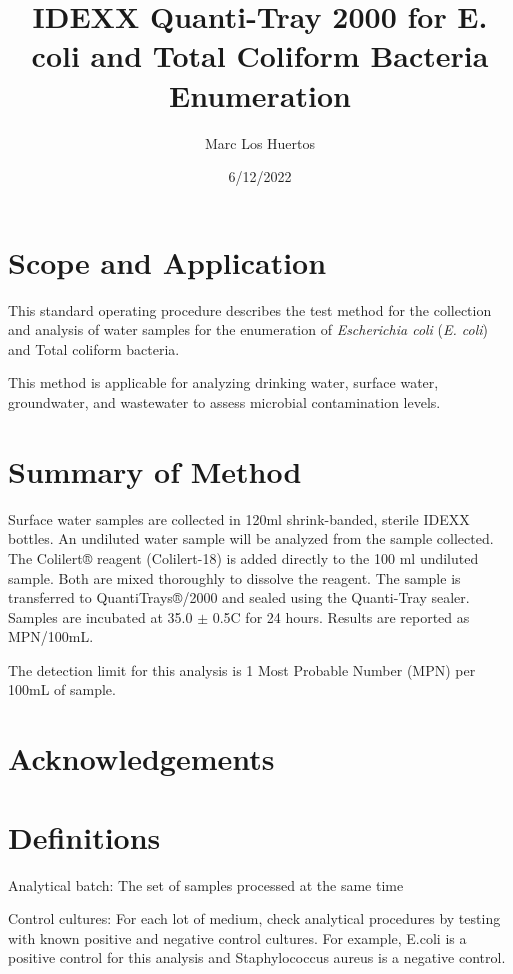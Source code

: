 \documentclass[12pt]{../SOP4_alpha}\usepackage[]{graphicx}\usepackage[]{xcolor}
\title{IDEXX Quanti-Tray 2000 for E. coli and Total Coliform Bacteria Enumeration}
\date{6/12/2022}
\author{Marc Los Huertos}
\begin{document}
\maketitle

\section{Scope and Application}

\NP This standard operating procedure describes the test method for the collection and analysis of water samples for the enumeration of \emph{Escherichia coli} (\emph{E. coli}) and Total coliform bacteria.

\NP This method is applicable for analyzing drinking water, surface water, groundwater, and wastewater to assess microbial contamination levels.

\section{Summary of Method}

\NP Surface water samples are collected in 120ml shrink-banded, sterile IDEXX 
bottles. An undiluted water sample will be analyzed from the sample collected.
The Colilert® reagent  (Colilert-18)  is added directly to the 100 ml undiluted sample. Both 
are mixed thoroughly to dissolve the reagent. The sample is transferred to 
QuantiTrays®/2000 and sealed using the Quanti-Tray sealer. Samples are incubated  at 35.0 $\pm$ 0.5\degree C for 24 hours. Results are reported as MPN/100mL. 

\NP The detection limit for this analysis is 1 Most Probable Number (MPN) per 100mL of sample. 

\tableofcontents

\newpage

\section{Acknowledgements}

\section{Definitions}

\NP Analytical batch: The set of samples processed at the same time

\NP Control cultures: For each lot of medium, check analytical procedures by
testing with known positive and negative control cultures. For example,
E.coli is a positive control for this analysis and Staphylococcus aureus is a
negative control.
\end{document}
